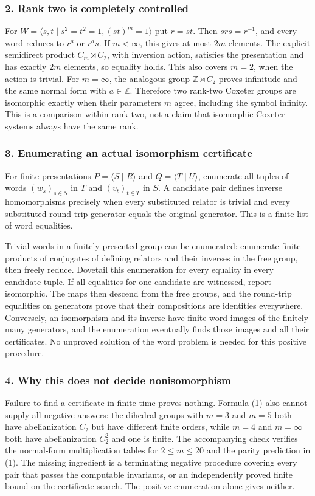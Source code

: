 \documentclass[11pt,a4paper]{article}
\begin{document}
\subsubsection{2. Rank two is completely controlled}
For $W=\langle s,t\mid s^2=t^2=1,(st)^m=1\rangle$ put $r=st$. Then $srs=r^{-1}$, and every word reduces to $r^a$ or $r^as$. If $m<\infty$, this gives at most $2m$ elements. The explicit semidirect product $C_m\rtimes C_2$, with inversion action, satisfies the presentation and has exactly $2m$ elements, so equality holds. This also covers $m=2$, when the action is trivial. For $m=\infty$, the analogous group $\mathbb Z\rtimes C_2$ proves infinitude and the same normal form with $a\in\mathbb Z$. Therefore two rank-two Coxeter groups are isomorphic exactly when their parameters $m$ agree, including the symbol infinity. This is a comparison within rank two, not a claim that isomorphic Coxeter systems always have the same rank.

\subsubsection{3. Enumerating an actual isomorphism certificate}
For finite presentations $P=\langle S\mid R\rangle$ and $Q=\langle T\mid U\rangle$, enumerate all tuples of words $(w_s)_{s\in S}$ in $T$ and $(v_t)_{t\in T}$ in $S$. A candidate pair defines inverse homomorphisms precisely when every substituted relator is trivial and every substituted round-trip generator equals the original generator. This is a finite list of word equalities.

Trivial words in a finitely presented group can be enumerated: enumerate finite products of conjugates of defining relators and their inverses in the free group, then freely reduce. Dovetail this enumeration for every equality in every candidate tuple. If all equalities for one candidate are witnessed, report isomorphic. The maps then descend from the free groups, and the round-trip equalities on generators prove that their compositions are identities everywhere. Conversely, an isomorphism and its inverse have finite word images of the finitely many generators, and the enumeration eventually finds those images and all their certificates. No unproved solution of the word problem is needed for this positive procedure.

\subsubsection{4. Why this does not decide nonisomorphism}
Failure to find a certificate in finite time proves nothing. Formula (1) also cannot supply all negative answers: the dihedral groups with $m=3$ and $m=5$ both have abelianization $C_2$ but have different finite orders, while $m=4$ and $m=\infty$ both have abelianization $C_2^2$ and one is finite. The accompanying check verifies the normal-form multiplication tables for $2\leq m\leq20$ and the parity prediction in (1). The missing ingredient is a terminating negative procedure covering every pair that passes the computable invariants, or an independently proved finite bound on the certificate search. The positive enumeration alone gives neither.
\end{document}
